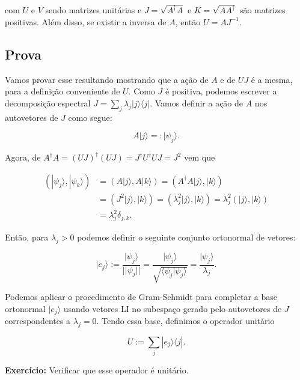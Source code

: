 \documentclass[11pt]{article}
\begin{document}
com \(U\) e \(V\) sendo matrizes unitárias e \(J=\sqrt{A^{\dagger}A}\) e
\(K=\sqrt{AA^{\dagger}}\) são matrizes positivas. Além disso, se existir
a inversa de \(A\), então \(U=AJ^{-1}\).

\subsection{Prova}\label{prova}

Vamos provar esse resultando mostrando que a ação de \(A\) e de \(UJ\) é
a mesma, para a definição conveniente de \(U\). Como \(J\) é positiva,
podemos escrever a decomposição espectral
\(J=\sum_{j}\lambda_{j}|j\rangle\langle j|\). Vamos definir a ação de
\(A\) nos autovetores de \(J\) como segue:

\begin{equation}
A|j\rangle=:|\psi_{j}\rangle.
\end{equation}

Agora, de
\(A^{\dagger}A=(UJ)^{\dagger}(UJ)=J^{\dagger}U^{\dagger}UJ=J^{2}\) vem
que

\begin{align}
(|\psi_{j}\rangle,|\psi_{k}\rangle) & = (A|j\rangle,A|k\rangle) = (A^{\dagger}A|j\rangle,|k\rangle) \\
& = (J^{2}|j\rangle,|k\rangle) = (\lambda_{j}^{2}|j\rangle,|k\rangle) = \lambda_{j}^{2}(|j\rangle,|k\rangle) \\
& = \lambda_{j}^{2}\delta_{j,k}.
\end{align}

Então, para \(\lambda_{j}>0\) podemos definir o seguinte conjunto
ortonormal de vetores:

\begin{equation}
|e_{j}\rangle := \frac{|\psi_{j}\rangle}{||\psi_{j}||} = \frac{|\psi_{j}\rangle}{\sqrt{\langle\psi_{j}|\psi_{j}\rangle}}=\frac{|\psi_{j}\rangle}{\lambda_{j}}.
\end{equation}

Podemos aplicar o procedimento de Gram-Schmidt para completar a base
ortonormal \(|e_{j}\rangle\) usando vetores LI no subespaço gerado pelo
autovetores de \(J\) correspondentes a \(\lambda_{j}=0\). Tendo essa
base, definimos o operador unitário

\begin{equation}
U:=\sum_{j}|e_{j}\rangle\langle j|.
\end{equation}

\textbf{Exercício:} Verificar que esse operador é unitário.
\end{document}
